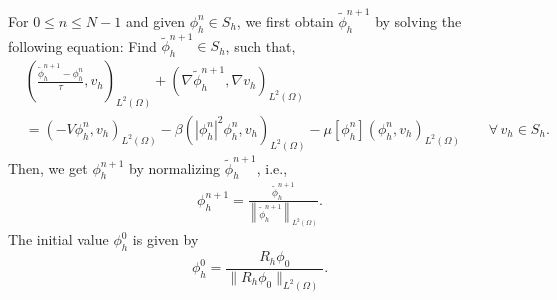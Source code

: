 \documentclass{siamart250211}
\def\nn{\nonumber}
\begin{document}
For $0 \le n \le N-1$ and given $\phi_h^n \in S_h$, we first obtain $\tilde{\phi}_h^{n+1}$ by solving the following equation: Find $\tilde{\phi}_h^{n+1} \in S_h$, such that,
\begin{align}
	&\left(\frac{ \tilde{\phi}_h^{n+1} -  \phi_h^{n}}{\tau},v_h\right)_{L^2(\Omega)} + (\nabla \tilde{\phi}_h^{n+1}, \nabla v_h )_{L^2(\Omega)} \nn \\
    &= \left( - V\phi_h^{n}, v_h \right)_{L^2(\Omega)} - \beta \left( |\phi_h^{n}|^2\phi_h^{n}, v_h \right)_{L^2(\Omega)} - \mu[\phi_h^{n}]\left(\phi_h^{n},v_h \right)_{L^2(\Omega)} \qquad \forall\, v_h \in S_h. \label{equ: numerical scheme 1} 
    \end{align}
Then, we get $\phi_h^{n+1}$ by normalizing $\tilde{\phi}_h^{n+1}$, i.e.,
\begin{align}
	 \phi_h^{n+1}   = \frac{ \tilde{\phi}_h^{n+1}  }{\left\| \tilde{\phi}_h^{n+1}  \right\|_{L^2(\Omega)}}. \label{equ: numerical scheme 2}
\end{align}
The initial value $\phi_h^0$ is given by 
\begin{equation}\label{equ: numerical scheme 3}
	 \phi_h^0  =  \frac{R_h  \phi_0 }{\| R_h  \phi_0 \|_{L^2(\Omega)} }.
\end{equation}
\end{document}
